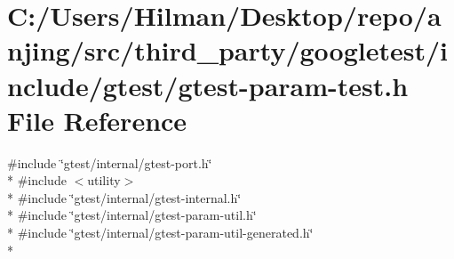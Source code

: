 \hypertarget{gtest-param-test_8h}{}\section{C\+:/\+Users/\+Hilman/\+Desktop/repo/anjing/src/third\+\_\+party/googletest/include/gtest/gtest-\/param-\/test.h File Reference}
\label{gtest-param-test_8h}
{\ttfamily \#include \char`\"{}gtest/internal/gtest-\/port.\+h\char`\"{}}\\*
{\ttfamily \#include $<$utility$>$}\\*
{\ttfamily \#include \char`\"{}gtest/internal/gtest-\/internal.\+h\char`\"{}}\\*
{\ttfamily \#include \char`\"{}gtest/internal/gtest-\/param-\/util.\+h\char`\"{}}\\*
{\ttfamily \#include \char`\"{}gtest/internal/gtest-\/param-\/util-\/generated.\+h\char`\"{}}\\*
